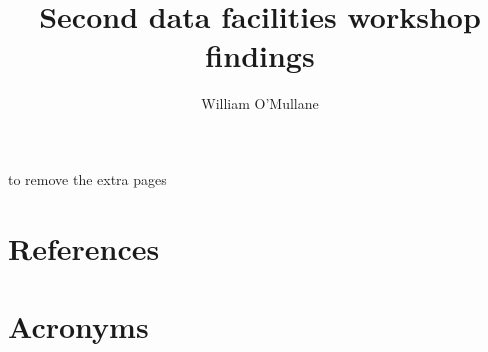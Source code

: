 \documentclass[DM,authoryear,toc]{lsstdoc}
\title{Second data facilities workshop findings}
\author{%
William O'Mullane
}
\date{\vcsDate}
\begin{document}
\mkshorttitle to remove the extra pages









\appendix
\section{References} \label{sec:bib}
\renewcommand{\refname}{} %


\section{Acronyms} \label{sec:acronyms}

\end{document}
